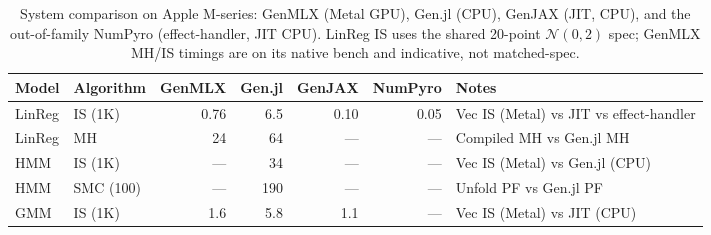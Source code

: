 \begin{table}[t]
\centering
\caption{System comparison on Apple M-series: GenMLX (Metal GPU), Gen.jl (CPU), GenJAX (JIT, CPU), and the out-of-family NumPyro (effect-handler, JIT CPU). LinReg IS uses the shared 20-point $\mathcal{N}(0,2)$ spec; GenMLX MH/IS timings are on its native bench and indicative, not matched-spec.}
\label{tab:system-comparison}
\begin{tabular}{l l r r r r l}
\toprule
Model & Algorithm & GenMLX & Gen.jl & GenJAX & NumPyro & Notes \\
\midrule
LinReg & IS (1K) & 0.76 & 6.5 & 0.10 & 0.05 & Vec IS (Metal) vs JIT vs effect-handler \\
LinReg & MH & 24 & 64 & --- & --- & Compiled MH vs Gen.jl MH \\
HMM & IS (1K) & --- & 34 & --- & --- & Vec IS (Metal) vs Gen.jl (CPU) \\
HMM & SMC (100) & --- & 190 & --- & --- & Unfold PF vs Gen.jl PF \\
GMM & IS (1K) & 1.6 & 5.8 & 1.1 & --- & Vec IS (Metal) vs JIT (CPU) \\
\bottomrule
\end{tabular}
\end{table}

